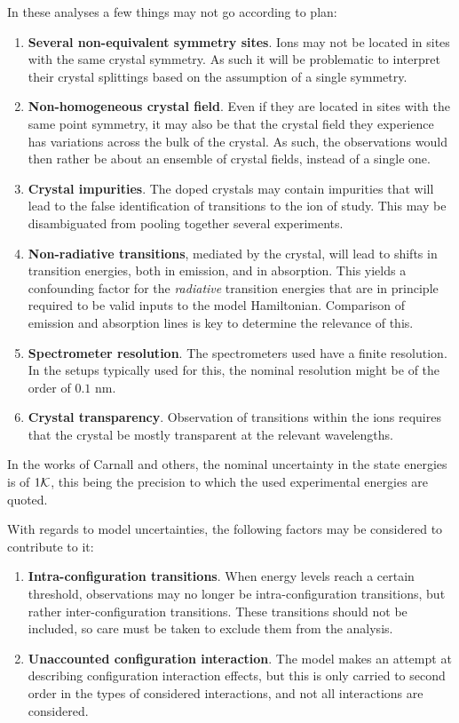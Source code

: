 \documentclass[11pt, twoside,openright]{article}
\begin{document}
In these analyses a few things may not go according to plan:

\begin{enumerate}
	\item \textbf{Several non-equivalent symmetry sites}. Ions may not be located in sites with the same crystal symmetry. As such it will be problematic to interpret their crystal splittings based on the assumption of a single symmetry.
	\item \textbf{Non-homogeneous crystal field}. Even if they are located in sites with the same point symmetry, it may also be that the crystal field they experience has variations across the bulk of the crystal. As such, the observations would then rather be about an ensemble of crystal fields, instead of a single one.
	\item \textbf{Crystal impurities}. The doped crystals may contain impurities that will lead to the false identification of transitions to the ion of study. This may be disambiguated from pooling together several experiments.
	\item \textbf{Non-radiative transitions}, mediated by the crystal, will lead to shifts in transition energies, both in emission, and in absorption. This yields a confounding factor for the \textit{radiative} transition energies that are in principle required to be valid inputs to the model Hamiltonian. Comparison of emission and absorption lines is key to determine the relevance of this.
	\item \textbf{Spectrometer resolution}. The spectrometers used have a finite resolution. In the setups typically used for this, the nominal resolution might be of the order of $0.1\text{ nm}$.
	\item \textbf{Crystal transparency}. Observation of transitions within the ions requires that the crystal be mostly transparent at the relevant wavelengths.
\end{enumerate}

In the works of Carnall and others, the nominal uncertainty in the state energies is of $1 \mathcal{K}$, this being the precision to which the used experimental energies are quoted.

With regards to model uncertainties, the following factors may be considered to contribute to it: 
\begin{enumerate}
\item \textbf{Intra-configuration transitions}. When energy levels reach a certain threshold, observations may no longer be intra-configuration transitions, but rather inter-configuration transitions. These transitions should not be included, so care must be taken to exclude them from the analysis.
\item \textbf{Unaccounted configuration interaction}. The model makes an attempt at describing configuration interaction effects, but this is only carried to second order in the types of considered interactions, and not all interactions are considered.
\end{enumerate}
\end{document}
